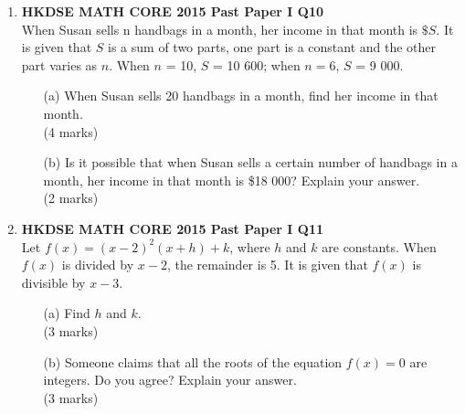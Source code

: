 \documentclass[12pt]{article}
\begin{document}
\begin{enumerate}
	\item \textbf{HKDSE MATH CORE 2015 Past Paper I Q10}\\
	When Susan sells n handbags in a month, her income in that month is $\$S$. It is given that $S$ is a sum of two parts, one part is a constant and the other part varies as $n$. When $n$ = 10, $S$ = 10 600; when $n = 6$, $S$ = 9 000.
	\begin{enumerate}
		\item[(a)] When Susan sells 20 handbags in a month, find her income in that month. \\(4 marks)
		\item[(b)] Is it possible that when Susan sells a certain number of handbags in a month, her income in that month is \$18 000? Explain your answer. \\(2 marks)
	\end{enumerate}

	\item \textbf{HKDSE MATH CORE 2015 Past Paper I Q11}\\
	Let $f(x) = (x - 2)^2(x+h)+k$, where $h$ and $k$ are constants. When  $f(x)$ is divided by $x - 2$, the remainder is 5. It is given that  $f(x)$ is divisible by $x - 3$.
	\begin{enumerate}
		\item[(a)] Find $h$ and $k$. \\(3 marks)
		\item[(b)] Someone claims that all the roots of the equation  $f(x) = 0$ are integers. Do you agree? Explain your answer. \\(3 marks)
	\end{enumerate}


\end{enumerate}
\end{document}
